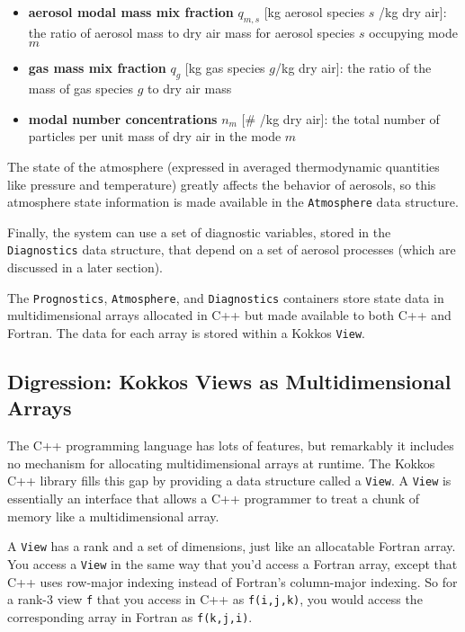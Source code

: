 \begin{itemize}
  \item {\bf aerosol modal mass mix fraction} $q_{m,s}$ [kg aerosol species $s$ /kg dry air]:
        the ratio of aerosol mass to dry air mass for aerosol species $s$
        occupying mode $m$
  \item {\bf gas mass mix fraction} $q_g$ [kg gas species $g$/kg dry air]: the
        ratio of the mass of gas species $g$ to dry air mass
  \item {\bf modal number concentrations} $n_m$ [\# /kg dry air]: the total number of
        particles per unit mass of dry air in the mode $m$
\end{itemize}

The state of the atmosphere (expressed in averaged thermodynamic quantities
like pressure and temperature) greatly affects the behavior of aerosols, so
this atmosphere state information is made available in the \texttt{Atmosphere} data
structure.

Finally, the system can use a set of diagnostic variables, stored in the
\texttt{Diagnostics} data structure, that depend on a set of aerosol processes
(which are discussed in a later section).

The \texttt{Prognostics}, \texttt{Atmosphere}, and \texttt{Diagnostics}
containers store state data in multidimensional arrays allocated in C++ but made
available to both C++ and Fortran. The data for each array is stored within a
Kokkos \texttt{View}.

\subsection*{Digression: Kokkos Views as Multidimensional Arrays}

The C++ programming language has lots of features, but remarkably it includes no
mechanism for allocating multidimensional arrays at runtime. The Kokkos C++
library fills this gap by providing a data structure called a \texttt{View}. A
\texttt{View} is essentially an interface that allows a C++ programmer to treat a
chunk of memory like a multidimensional array.

A \texttt{View} has a rank and a set of dimensions, just like an allocatable
Fortran array. You access a \texttt{View} in the same way that you'd access a
Fortran array, except that C++ uses row-major indexing instead of Fortran's
column-major indexing. So for a rank-3 view \texttt{f} that you access in C++
as \texttt{f(i,j,k)}, you would access the corresponding array in Fortran as
\texttt{f(k,j,i)}.

